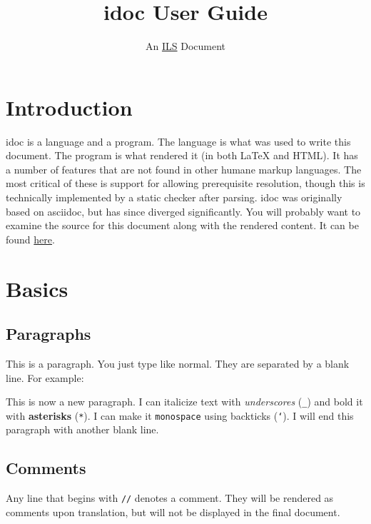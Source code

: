 \documentclass[mpinclude=true]{scrartcl}
\title{idoc User Guide}
\subtitle{An \href{https://www.independentlearning.science}{ILS} Document}
\begin{document}
\maketitle
\tableofcontents
\pagestyle{headings}

\section{Introduction}


idoc is a language and a program.  The language is what was used to
write this document.  The program is what rendered it (in both LaTeX
and HTML).  It has a number of features that are not found in other
humane markup languages.  The most critical of these is support for
allowing prerequisite resolution, though this is technically
implemented by a static checker after parsing.  idoc was originally
based on asciidoc, but has since diverged significantly.  You will
probably want to examine the source for this document along with the
rendered content.  It can be found
\href{httpwww.independentlearning.science/source.idoc}{here}.

\section{Basics}


\subsection{Paragraphs}


This is a paragraph.  You just type like normal.  They are separated
by a blank line.  For example:

This is now a new paragraph.  I can italicize text with \emph{underscores}
(\texttt{\_}) and bold it with \textbf{asterisks} (\texttt{*}).  I can make it \texttt{monospace}
using backticks (\texttt{`}).  I will end this paragraph with another blank
line.

\subsection{Comments}


Any line that begins with \texttt{//} denotes a comment.  They will be
rendered as comments upon translation, but will not be displayed in
the final document.


\end{document}
